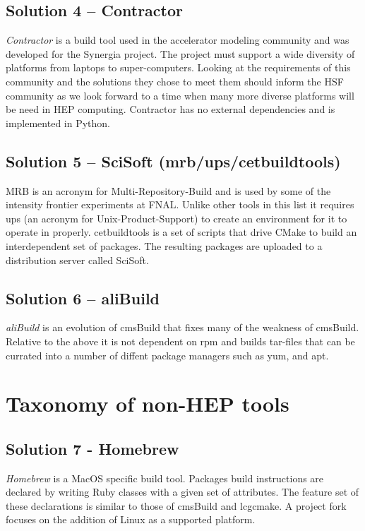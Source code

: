 \documentclass[12pt,a4paper]{article}
\begin{document}
\subsection{Solution 4 -- Contractor} 
\emph{Contractor}\cite{contractor} is a build tool used in the accelerator modeling community and was developed for the Synergia project.  The project must support a wide diversity of platforms from laptops to super-computers.  Looking at the requirements of this community and the solutions they chose to meet them should inform the HSF community as we look forward to a time when many more diverse platforms will be need in HEP computing.  Contractor has no external dependencies and is implemented in Python.

\subsection{Solution 5 -- SciSoft (mrb/ups/cetbuildtools)}
MRB is an acronym for Multi-Repository-Build and is used by some of the intensity frontier experiments at FNAL. Unlike other tools in this list it requires ups (an acronym for Unix-Product-Support) to create an environment for it to operate in properly.  cetbuildtools is a set of scripts that drive CMake to build an interdependent set of packages.  The resulting packages are uploaded to a distribution server called SciSoft.

\subsection{Solution 6 -- aliBuild}
\emph{aliBuild}\cite{aliBuild} is an evolution of cmsBuild that fixes many of the weakness of cmsBuild. Relative to the above it is not dependent on rpm and builds tar-files that can be currated into a number of diffent package managers such as yum, and apt.

\section{Taxonomy of non-HEP tools}
\subsection{Solution 7 - Homebrew }
\emph{Homebrew}\cite{homebrew} is a MacOS specific build tool. Packages build instructions are declared by writing Ruby classes with a given set of attributes. The feature set of these declarations is similar to those of cmsBuild and lcgcmake. A project fork focuses on the addition of Linux as a supported platform.
\end{document}
